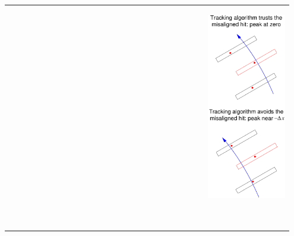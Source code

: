 \documentclass[compress]{beamer}
\begin{document}
\begin{frame}
\begin{tabular}{p{0.65\linewidth} c p{0.3\linewidth}}
\begin{minipage}{\linewidth}
  \vspace{0.25 cm} \mbox{ }
\end{minipage} & &
\begin{minipage}{\linewidth}
  \vspace{-0.5 cm}
  \includegraphics[width=\linewidth]{two_cases.pdf}

  \vspace{0.5 cm} \mbox{ }
\end{minipage}
\end{tabular}
\end{frame}
\end{document}

